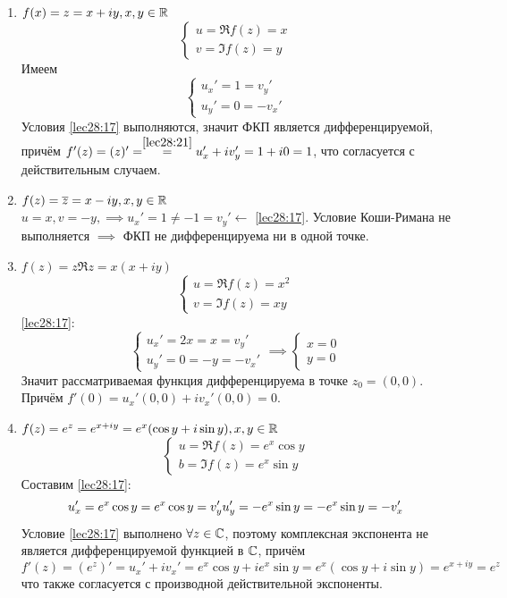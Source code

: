\documentclass[../../main.tex]{subfiles}
\begin{document}
\begin{exmps}
\begin{enumerate}
	\item $ f(x) = z = x + iy, x, y \in \mathbb{R} $
	\[
	\begin{cases}
		u = \Re f(z) = x\\
		v = \Im f(z) = y
	\end{cases}
	\]
	Имеем 
	\[
	\begin{cases}
		u_x' = 1 = v_y'\\
		u_y' = 0 = -v_x'
	\end{cases}
	\]
	Условия \eqref{lec28:17} выполняются, значит ФКП является дифференцируемой,
	причём $ f'(z) = (z)' = \stackrel{\eqref{lec28:21}}{=} u_x' + iv_y' = 
	1 + i0 = 1 $, что согласуется с действительным случаем.
	\item $ f(z) = \overline{z} = x - iy, x, y \in \mathbb{R} $\\
	$ u = x, v = -y, \implies u_x' = 1 \neq -1 = v_y' \leftarrow $ 
	\eqref{lec28:17}. Условие Коши-Римана не выполняется $ \implies $ ФКП 
	не дифференцируема ни в одной точке.
	\item $ f(z) = z \Re z = x(x + iy) $
	\[
	\begin{cases}
		u = \Re f(z) = x^2\\
		v = \Im f(z) = xy
	\end{cases}
	\]
	\eqref{lec28:17}:
	\[
	\begin{cases}
		u_x' = 2x = x = v_y'\\
		u_y' = 0 = -y = -v_x'
	\end{cases} \implies
	\begin{cases}
		x = 0\\
		y = 0
	\end{cases}
	\]
	Значит рассматриваемая функция дифференцируема в точке $ z_0 = (0, 0) $.
	Причём
	$ f'(0) = u_x'(0, 0) + iv_x'(0, 0) = 0 $.
	\item $ f(z) = e^z = e^{x + iy} = e^x(\cos y + i\sin y), x, y \in \mathbb{R} $\\
	\[
	\begin{cases}
		u = \Re f(z) = e^x \cos y\\
		b = \Im f(z) = e^x \sin y
	\end{cases}
	\]
	Составим \eqref{lec28:17}:
	\[
	u_x' = e^x \cos y = e^x \cos y = v_y'\\
	u_y' = -e^x \sin y = -e^x \sin y = -v_x'
	\]
	Условие \eqref{lec28:17} выполнено $ \forall z \in \mathbb{C} $, 
	поэтому комплексная экспонента не является дифференцируемой функцией в $ \mathbb{C} 
	$, причём
	\[
	f'(z) = (e^z)' = u_x' + iv_x' = e^x \cos y + ie^x \sin y =
	e^x(\cos y + i\sin y) = e^{x + iy} = e^z
	\]
	что также согласуется с производной действительной экспоненты.
\end{enumerate}
\end{exmps}
\end{document}
